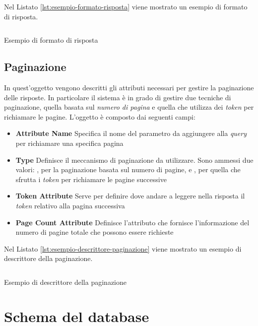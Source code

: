 Nel Listato \ref{lst:esempio-formato-risposta} viene mostrato un esempio di formato di risposta.

\begin{listing}[h]
	\inputminted{json}{5-implementazione-backend/Codice/esempio_formato_risposta.json}
	\caption{Esempio di formato di risposta}
	\label{lst:esempio-formato-risposta}
\end{listing}

\subsection{Paginazione\label{sec:descrittore-paginazione}}

In quest'oggetto vengono descritti gli attributi necessari per gestire la paginazione delle risposte. In particolare il sistema è in grado di gestire due tecniche di paginazione, quella basata sul \emph{numero di pagina} e quella che utilizza dei \emph{token} per richiamare le pagine. L'oggetto è composto dai seguenti campi:

\begin{itemize}
	\item \textbf{Attribute Name}
	Specifica il nome del parametro da aggiungere alla \emph{query} per richiamare una specifica pagina
	\item \textbf{Type}
	Definisce il meccanismo di paginazione da utilizzare. Sono ammessi due valori: , per la paginazione basata sul numero di pagine, e , per quella che sfrutta i \emph{token} per richiamare le pagine successive
	\item \textbf{Token Attribute}
	Serve per definire dove andare a leggere nella risposta il \emph{token} relativo alla pagina successiva
	\item \textbf{Page Count Attribute}
	Definisce l'attributo che fornisce l'informazione del numero di pagine totale che possono essere richieste
\end{itemize}

Nel Listato \ref{lst:esempio-descrittore-paginazione} viene mostrato un esempio di descrittore della paginazione.

\begin{listing}[h]
	\inputminted{json}{5-implementazione-backend/Codice/esempio_descrittore_paginazione.json}
	\caption{Esempio di descrittore della paginazione}
	\label{lst:esempio-descrittore-paginazione}
\end{listing}

\section{Schema del database\label{sec:schema-database}}

